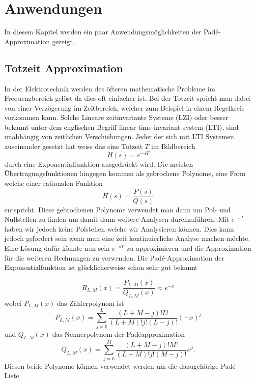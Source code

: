 %
%
%
\section{Anwendungen
\label{pade:section:Anwendungen}}

In diesem Kapitel werden ein paar Anwendungsmöglichkeiten der Padé-Approximation gezeigt.



\subsection{Totzeit Approximation
\label{pade:subsection:totzeit}}

In der Elektrotechnik werden des öfteren mathematische Probleme im Frequenzbereich gelöst da dies oft einfacher ist.
Bei der Totzeit spricht man dabei von einer Verzögerung im Zeitbereich, welcher zum Beispiel in einem Regelkreis vorkommen kann.
Solche Lineare zeitinvariante Systeme (LZI) oder besser bekannt unter dem englischen Begriff linear time-invariant system (LTI), sind unabhängig von zeitlichen Verschiebungen. 
Jeder der sich mit LTI Systemen auseinander gesetzt hat weiss das eine Totzeit $T$ im Bildbereich
\begin{equation*}
H(s) = e^{-sT}
\end{equation*}
durch eine Exponentialfunktion ausgedrückt wird.
Die meisten Übertragungsfunktionen hingegen kommen als gebrochene Polynome, eine Form welche einer rationalen Funktion
\begin{equation*}
H(s)=\frac{P(s)}{Q(s)}
\end{equation*}
entspricht.
Diese gebrochenen Polynome verwendet man dann um Pol- und Nullstellen zu finden um damit dann weitere Analysen durchzuführen. 
Mit $e^{-sT}$ haben wir jedoch keine Polstellen welche wir Analysieren können.
Dies kann jedoch gefordert sein wenn man eine zeit kontinuierliche Analyse machen möchte.
Eine Lösung dafür könnte nun sein $e^{-sT}$ zu approximieren und die Approximation für die weiteren Rechnungen zu verwenden.
Die Padé-Approximation der Exponentialfunktion ist glücklicherweise schon sehr gut bekannt \cite{pade:moler}

\begin{equation}
R_{L, M}(x)
=
\frac{P_{L, M}(x)}{Q_{L, M}(x)} \approx e^{-x}
\end{equation}
wobei $P_{L, M}(x)$ das Zählerpolynom ist
\begin{equation}
P_{L, M}(x)
=
\sum_{j=0}^{L} \frac{(L+M-j) ! L !}{(L+M) ! j !(L-j) !}(-x)^{j}
\end{equation}
und $Q_{L, M}(x)$ das Nennerpolynom der Padéapproximation
\begin{equation}
Q_{L, M}(x)
=
\sum_{j=0}^{M} \frac{(L+M-j) ! M !}{(L+M) ! j !(M-j) !} x^{j}.
\end{equation}
Diesen beide Polynome können verwendet werden um die dazugehörige Padé-Liste 

